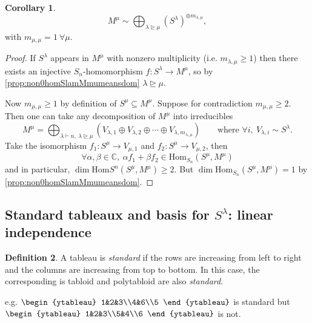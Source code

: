 \documentclass[a4paper]{article}
\newcommand{\C}{\mathbb{C}}
\newcommand{\Hom}{\text{Hom}}
\theoremstyle{definition}
\newtheorem{defn}{Definition}[subsection]
\newtheorem{coro}[defn]{Corollary}
\begin{document}
\begin{coro}
\[
M^\mu\sim\bigoplus_{\lambda\unrhd\mu} (S^\lambda)^{\oplus m_{\lambda,\mu}},
\]
with $m_{\mu,\mu}=1 \ \forall \mu$.
\end{coro}
\begin{proof}
If $S^\lambda$ appears in $M^\mu$ with nonzero multiplicity (i.e. $m_{\lambda,\mu}\geq 1$) then there exists an injective $S_n$-homomorphism $f:S^\lambda\rightarrow M^\mu$, so by \ref{prop:non0homSlamMmumeansdom} $\lambda\unrhd\mu$.

Now $m_{\mu,\mu}\geq 1$ by definition of $S^\mu\subseteq M^\mu$. Suppose for contradiction $m_{\mu,\mu}\geq 2$. Then one can take any decomposition of $M^\mu$ into irreducibles
\[
M^\mu=\bigoplus_{\lambda\vdash n,\ \lambda\unrhd\mu} \left(V_{\lambda,1}\oplus V_{\lambda,2}\oplus\cdots\oplus V_{\lambda,m_{\lambda,\mu}}\right) \qquad \text{where } \forall i,\ V_{\lambda,i}\sim S^\lambda.
\]
Take the isomorphism $f_1:S^\mu\rightarrow V_{\mu,1}$ and $f_2:S^\mu\rightarrow V_{\mu,2}$, then
\[
\forall\alpha,\beta\in\C,\ \alpha f_1+\beta f_2\in\Hom_{S_n}(S^\mu,M^\mu)
\]
and in particular, $\dim\Hom{S^n}(S^\mu,M^\mu)\geq 2$. But $\dim\Hom_{S_n}(S^\mu,M^\mu)=1$ by \ref{prop:non0homSlamMmumeansdom}.
\end{proof}

\subsection{Standard tableaux and basis for $S^\lambda$: linear independence}
\begin{defn}
A tableau is \textit{standard} if the rows are increasing from left to right and the columns are increasing from top to bottom. In this case, the corresponding is tabloid and polytabloid are also \textit{standard}.
\end{defn}
e.g. $\begin{ytableau}
1&2&3\\4&6\\5
\end{ytableau}$ is standard but $\begin{ytableau}
1&2&3\\5&4\\6
\end{ytableau}$ is not.
\end{document}
